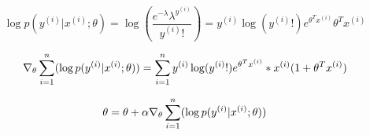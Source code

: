 \begin{answer}

\begin{equation*}
\log p(y^{(i)} | x^{(i)}; \theta) = \log(\frac{e^{-\lambda} \lambda^{y^{(i)}}}{y^{(i)}!}) = 
y^{(i)}\log(y^{(i)}!)e^{\theta^Tx^{(i)}}\theta^Tx^{(i)}
\end{equation*}

\begin{equation*}
\nabla_\theta \sum_{i=1}^{n}(\log p(y^{(i)} | x^{(i)}; \theta)) = \sum_{i=1}^{n} y^{(i)}\log(y^{(i)}!) e^{\theta^Tx^{(i)}} * x^{(i)} (1 + \theta^Tx^{(i)})
\end{equation*}

\begin{equation*}
\theta = \theta + \alpha \nabla_\theta \sum_{i=1}^{n}(\log p(y^{(i)} | x^{(i)}; \theta)) 
\end{equation*}


\end{answer}
